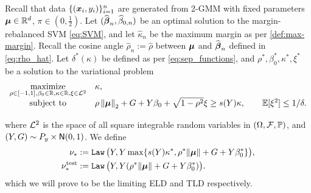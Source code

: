 Recall that data $\{(\xx_i, y_i)\}_{i = 1}^n$ are generated from 2-GMM with fixed parameters $\bmu \in \R^d$, $\pi \in (0, \frac12)$. Let $(\hat \vbeta_n, \hat \beta_{0, n})$ be an optimal solution to the margin-rebalanced SVM \cref{eq:SVM}, and let $\hat\kappa_n$ be the maximum margin as per \cref{def:max-margin}. Recall the cosine angle $\hat \rho_n:= \hat \rho$ between $\vmu$ and $\hat\vbeta_n$ defined in \cref{eq:rho_hat}. Let $\delta^*(\kappa)$ be defined as per \cref{eq:sep_functions}, and $\rho^*, \beta_0^*, \kappa^*, \xi^*$ be a solution to the variational problem
\begin{equation}\label{eq:SVM_variation}
    \begin{aligned}
        \begin{array}{cl}
            \underset{ \rho \in [-1, 1], \beta_0 \in \R, \kappa \in \R, \xi \in \cL^2  }{ \mathrm{maximize} } & \kappa, \\
            \underset{ \phantom{\smash{\bm\beta \in \R^d, \beta_0 \in \R, \kappa \in \R} } }{\text{subject to}} &  
            \rho \norm{\bmu}_2 + G + Y \beta_0 + \sqrt{1 - \rho^2} \xi \ge s(Y) \kappa,  
            \qquad \E[\xi^2]  \le  1/\delta .
        \end{array}
    \end{aligned}
    \end{equation}
    where $\cL^2$ is the space of all square integrable random variables in $(\Omega, \mathcal{F}, \P)$, and $(Y, G) \sim P_y \times \normal(0,1)$. 
    We define
    \begin{equation*}
    \begin{aligned}
        \nu_* & := \Law \,\bigl( Y,  Y \max\{ s(Y)\kappa^*, \rho^* \| \bmu \| + G + Y \beta_0^* \} \bigr),  \\
        \nu^\mathrm{test}_* & := \Law \,\bigl( Y, Y (\rho^* \| \bmu \| + G + Y \beta_0^*) \bigr).
    \end{aligned}
    \end{equation*}
which we will prove to be the limiting ELD and TLD respectively.
